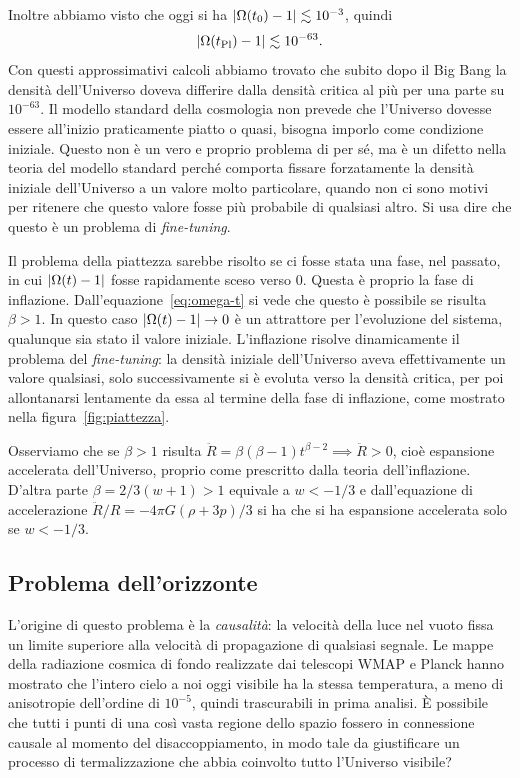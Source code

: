 Inoltre abbiamo visto che oggi si ha \(\lvert\Omega(t_{0}) - 1\rvert \lesssim
10^{-3}\), quindi
\begin{equation}
  \lvert\Omega(t_{\textup{Pl}}) - 1\rvert \lesssim 10^{-63}.
\end{equation}
Con questi approssimativi calcoli abbiamo trovato che subito dopo il Big Bang la
densità dell'Universo doveva differire dalla densità critica al più per una
parte su \(10^{-63}\).  Il modello standard della cosmologia non prevede che
l'Universo dovesse essere all'inizio praticamente piatto o quasi, bisogna
imporlo come condizione iniziale.  Questo non è un vero e proprio problema di
per sé, ma è un difetto nella teoria del modello standard perché comporta
fissare forzatamente la densità iniziale dell'Universo a un valore molto
particolare, quando non ci sono motivi per ritenere che questo valore fosse più
probabile di qualsiasi altro.  Si usa dire che questo è un problema di
\emph{fine-tuning}.

Il problema della piattezza sarebbe risolto se ci fosse stata una fase, nel
passato, in cui \(\lvert\Omega(t) - 1\rvert\) fosse rapidamente sceso verso \(0\).
Questa è proprio la fase di inflazione.  Dall'equazione~\eqref{eq:omega-t} si
vede che questo è possibile se risulta \(\beta > 1\).  In questo caso
\(\lvert\Omega(t) - 1\rvert \to 0\) è un attrattore per l'evoluzione del sistema,
qualunque sia stato il valore iniziale.  L'inflazione risolve dinamicamente il
problema del \emph{fine-tuning}: la densità iniziale dell'Universo aveva
effettivamente un valore qualsiasi, solo successivamente si è evoluta verso la
densità critica, per poi allontanarsi lentamente da essa al termine della fase
di inflazione, come mostrato nella figura~\ref{fig:piattezza}.

Osserviamo che se \(\beta>1\) risulta \(\ddot{R} = \beta(\beta-1)t^{\beta-2}
\implies \ddot{R} > 0\), cioè espansione accelerata dell'Universo, proprio come
prescritto dalla teoria dell'inflazione.  D'altra parte \(\beta = 2/3(w+1)>1\)
equivale a \(w < -1/3\) e dall'equazione di accelerazione \(\ddot{R}/R=-4\pi
G(\rho+3p)/3\) si ha che si ha espansione accelerata solo se \(w < -1/3\).

\subsection{Problema dell'orizzonte}
\label{sec:problema-orizzonte}

L'origine di questo problema è la \emph{causalità}: la velocità della luce nel
vuoto fissa un limite superiore alla velocità di propagazione di qualsiasi
segnale.  Le mappe della radiazione cosmica di fondo realizzate dai telescopi
WMAP e Planck hanno mostrato che l'intero cielo a noi oggi visibile ha la stessa
temperatura, a meno di anisotropie dell'ordine di \(10^{-5}\), quindi
trascurabili in prima analisi.  È possibile che tutti i punti di una così vasta
regione dello spazio fossero in connessione causale al momento del
disaccoppiamento, in modo tale da giustificare un processo di termalizzazione
che abbia coinvolto tutto l'Universo visibile?

